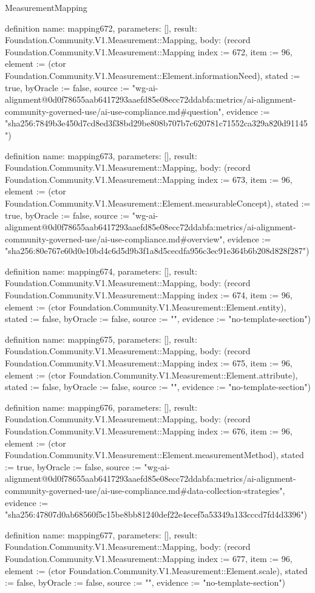 \begin{lexlean}{MeasurementMapping}
\begin{semanticmodule}
definition{
  name: mapping672,
  parameters: [],
  result: Foundation.Community.V1.Measurement::Mapping,
  body: (record Foundation.Community.V1.Measurement::Mapping {index := 672, item := 96, element := (ctor Foundation.Community.V1.Measurement::Element.informationNeed), stated := true, byOracle := false, source := "wg-ai-alignment@0d0f78655aab6417293aaefd85e08ecc72ddabfa:metrics/ai-alignment-community-governed-use/ai-use-compliance.md#question", evidence := "sha256:7849b3e450d7cd8ed3f38bd29be808b707b7c620781c71552ca329a820d91145"})
}

definition{
  name: mapping673,
  parameters: [],
  result: Foundation.Community.V1.Measurement::Mapping,
  body: (record Foundation.Community.V1.Measurement::Mapping {index := 673, item := 96, element := (ctor Foundation.Community.V1.Measurement::Element.measurableConcept), stated := true, byOracle := false, source := "wg-ai-alignment@0d0f78655aab6417293aaefd85e08ecc72ddabfa:metrics/ai-alignment-community-governed-use/ai-use-compliance.md#overview", evidence := "sha256:80e767e60d0e10bd4c6d5d9b3f1a8d5cecdfa956c3ec91e364b6b208d828f287"})
}

definition{
  name: mapping674,
  parameters: [],
  result: Foundation.Community.V1.Measurement::Mapping,
  body: (record Foundation.Community.V1.Measurement::Mapping {index := 674, item := 96, element := (ctor Foundation.Community.V1.Measurement::Element.entity), stated := false, byOracle := false, source := "", evidence := "no-template-section"})
}

definition{
  name: mapping675,
  parameters: [],
  result: Foundation.Community.V1.Measurement::Mapping,
  body: (record Foundation.Community.V1.Measurement::Mapping {index := 675, item := 96, element := (ctor Foundation.Community.V1.Measurement::Element.attribute), stated := false, byOracle := false, source := "", evidence := "no-template-section"})
}

definition{
  name: mapping676,
  parameters: [],
  result: Foundation.Community.V1.Measurement::Mapping,
  body: (record Foundation.Community.V1.Measurement::Mapping {index := 676, item := 96, element := (ctor Foundation.Community.V1.Measurement::Element.measurementMethod), stated := true, byOracle := false, source := "wg-ai-alignment@0d0f78655aab6417293aaefd85e08ecc72ddabfa:metrics/ai-alignment-community-governed-use/ai-use-compliance.md#data-collection-strategies", evidence := "sha256:47807d0ab68560f5c15be8bb81240def22e4ecef5a53349a133cccd7fd4d3396"})
}

definition{
  name: mapping677,
  parameters: [],
  result: Foundation.Community.V1.Measurement::Mapping,
  body: (record Foundation.Community.V1.Measurement::Mapping {index := 677, item := 96, element := (ctor Foundation.Community.V1.Measurement::Element.scale), stated := false, byOracle := false, source := "", evidence := "no-template-section"})
}


\end{semanticmodule}
\end{lexlean}

